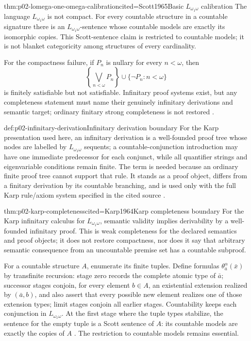\begin{hbtheorem}{thm:p02-lomega-one-omega-calibration}{cited=Scott1965}{Basic \(L_{\omega_1\omega}\) calibration}
The language \(L_{\omega_1\omega}\) is not compact.  For every countable
structure in a countable signature there is an \(L_{\omega_1\omega}\)-sentence
whose countable models are exactly its isomorphic copies.  This Scott-sentence
claim is restricted to countable models; it is not blanket categoricity among
structures of every cardinality.
\end{hbtheorem}

For the compactness failure, if \(P_n\) is nullary for every \(n<\omega\), then
\[
 \left\{\bigvee_{n<\omega}P_n\right\}
 \cup\{\neg P_n:n<\omega\}
\]
is finitely satisfiable but not satisfiable.  Infinitary proof systems exist,
but any completeness statement must name their genuinely infinitary
derivations and semantic target; ordinary finitary strong completeness is not
restored \cite{Karp1964,Scott1965}.

\begin{hbdefinition}{def:p02-infinitary-derivation}{Infinitary derivation boundary}
For the Karp presentation used here, an infinitary derivation is a well-founded
proof tree whose nodes are labelled by \(L_{\omega_1\omega}\) sequents; a
countable-conjunction introduction may have one immediate predecessor for each
conjunct, while all quantifier strings and eigenvariable conditions remain
finite. The term is needed because an ordinary finite proof tree cannot support
that rule. It stands as a proof object, differs from a finitary derivation by
its countable branching, and is used only with the full Karp rule/axiom system
specified in the cited source \cite{Karp1964}.
\end{hbdefinition}

\begin{hbtheorem}{thm:p02-karp-completeness}{cited=Karp1964}{Karp completeness boundary}
For the Karp infinitary calculus for \(L_{\omega_1\omega}\), semantic validity
implies derivability by a well-founded infinitary proof. This is weak
completeness for the declared semantics and proof objects; it does not restore
compactness, nor does it say that arbitrary semantic consequence from an
uncountable premise set has a countable subproof.
\end{hbtheorem}

For a countable structure \(A\), enumerate its finite tuples. Define formulas
\(\theta^\alpha_{\bar a}(\bar x)\) by transfinite recursion: stage zero records
the complete atomic type of \(\bar a\); successor stages conjoin, for every
element \(b\in A\), an existential extension realized by \((\bar a,b)\), and
also assert that every possible new element realizes one of those extension
types; limit stages conjoin all earlier stages. Countability keeps each
conjunction in \(L_{\omega_1\omega}\). At the first stage where the tuple
types stabilize, the sentence for the empty tuple is a Scott sentence of
\(A\): its countable models are exactly the copies of \(A\)
\cite{Scott1965}. The restriction to countable models remains essential.

